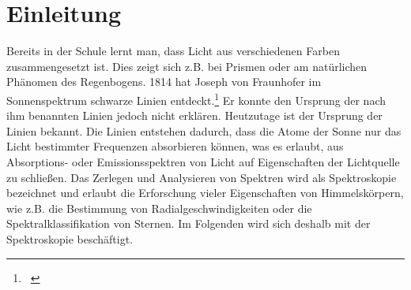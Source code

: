 \section{Einleitung}
Bereits in der Schule lernt man, dass Licht aus verschiedenen Farben zusammengesetzt ist. Dies zeigt sich z.B. bei Prismen oder am natürlichen Phänomen des Regenbogens. 1814 hat Joseph von Fraunhofer im Sonnenspektrum schwarze Linien entdeckt.\footnote{\ \cite{ktroskopie}} Er konnte den Ursprung der nach ihm benannten Linien jedoch nicht erklären. Heutzutage ist der Ursprung der Linien bekannt. Die Linien entstehen dadurch, dass die Atome der Sonne nur das Licht bestimmter Frequenzen absorbieren können, was es erlaubt, aus Absorptions- oder Emissionsspektren von Licht auf Eigenschaften der Lichtquelle zu schließen. Das Zerlegen und Analysieren von Spektren wird als Spektroskopie bezeichnet und erlaubt die Erforschung vieler Eigenschaften von Himmelskörpern, wie z.B. die Bestimmung von Radialgeschwindigkeiten oder die Spektralklassifikation von Sternen. Im Folgenden wird sich deshalb mit der Spektroskopie beschäftigt.

